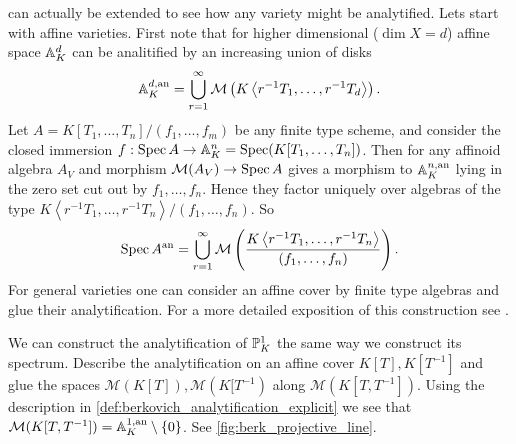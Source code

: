 \begin{example}
	 can actually be extended to see how any variety might be analytified. 
	Lets start with affine varieties. 
	First note that for higher dimensional ($\dim X = d$) affine space $\mathbb{A}_K^{d}$ can be analitified by an increasing union of disks \[
		\mathbb{A}_K^{d, \text{an}} = \bigcup_{r = 1} ^{\infty} \mathcal{M} \left(K \left<r^{-1} T_1, \ldots, r^{-1} T_d \right>\right)
	.\] 
	Let $A = K[T_1,\ldots, T_n] / (f_1, \ldots, f_m)$ be any finite type scheme, and consider the closed immersion $f: \operatorname{Spec} A \to \mathbb{A}_K^{n} = \operatorname{Spec} (K[T_1, \ldots, T_n]) $. 
	Then for any affinoid algebra $A_V$ and morphism $\mathcal{M} (A_V) \to \operatorname{Spec} A$ gives a morphism to $\mathbb{A}_K^{n, \text{an}}$ lying in the zero set cut out by $f_1, \ldots, f_n$. Hence they factor uniquely over algebras of the type $K \left<r^{-1} T_1, \ldots, r^{-1} T_n \right>/ (f_1, \ldots, f_n)$. 
	So \[
		\operatorname{Spec} A {}^{\text{an}} = \bigcup_{r= 1} ^{\infty} \mathcal{M} \left(\frac{K \left<r^{-1} T_1, \ldots, r^{-1} T_n \right>}{(f_1, \ldots, f_n)}\right)
	.\] 
	For general varieties one can consider an affine cover by finite type algebras and glue their analytification. 
	For a more detailed exposition of this construction see \cite{berkovichSpectralTheoryAnalytic2012}. 
\end{example}

\begin{example}
	We can construct the analytification of $\mathbb{P}^{1}_K$ the same way we construct its spectrum. 
Describe the analytification on an affine cover $K[T], K[T^{-1}]$ and glue the spaces $\mathcal{M} (K[T]), \mathcal{M} (K[T^{-1})$ along $\mathcal{M} (K[T, T^{-1}])$. 
Using the description in \cref{def:berkovich_analytification_explicit} we see that $\mathcal{M} (K[T, T^{-1}]) = \mathbb{A}^{1, \text{an}}_K \setminus \{0\} $.
See \cref{fig:berk_projective_line}. 
\end{example}


